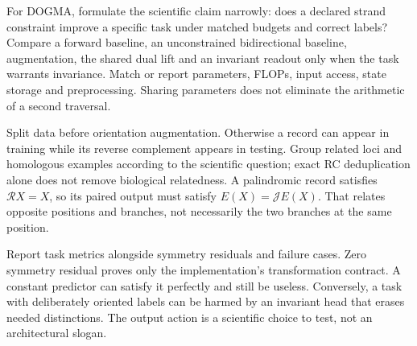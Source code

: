 For DOGMA, formulate the scientific claim narrowly: does a declared strand
constraint improve a specific task under matched budgets and correct labels?
Compare a forward baseline, an unconstrained bidirectional baseline,
augmentation, the shared dual lift and an invariant readout only when the
task warrants invariance. Match or report parameters, FLOPs, input access,
state storage and preprocessing. Sharing parameters does not eliminate the
arithmetic of a second traversal.

Split data before orientation augmentation. Otherwise a record can appear in
training while its reverse complement appears in testing. Group related loci
and homologous examples according to the scientific question; exact RC
deduplication alone does not remove biological relatedness. A palindromic
record satisfies $\mathcal RX=X$, so its paired output must satisfy
$E(X)=\mathcal JE(X)$. That relates opposite positions and branches, not
necessarily the two branches at the same position.

Report task metrics alongside symmetry residuals and failure cases. Zero
symmetry residual proves only the implementation's transformation contract.
A constant predictor can satisfy it perfectly and still be useless. Conversely,
a task with deliberately oriented labels can be harmed by an invariant head
that erases needed distinctions. The output action is a scientific choice
to test, not an architectural slogan.

